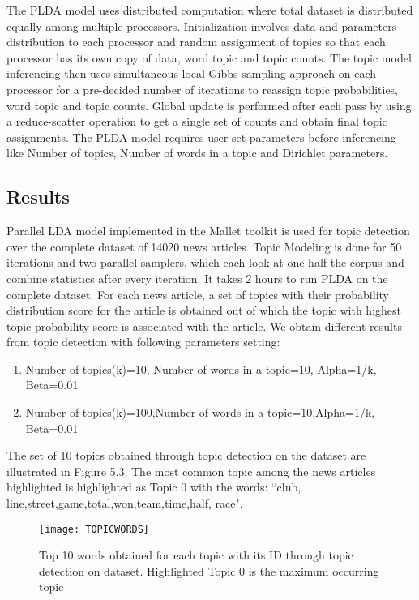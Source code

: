 The PLDA model uses distributed computation where total dataset is distributed equally among multiple processors. Initialization involves data and parameters distribution to each processor and random assignment of topics so that each processor has its own copy of data, word topic and topic counts. The topic model inferencing then uses simultaneous local Gibbs sampling approach on each processor for a pre-decided number of iterations to reassign topic probabilities, word topic and topic counts. Global update is performed after each pass by using a reduce-scatter operation to get a single set of counts and obtain final topic assignments.
The PLDA model requires user set parameters before inferencing like Number of topics, Number of words in a topic and Dirichlet parameters. 


\subsection{Results}

Parallel LDA model implemented in the Mallet\cite{McCallumMALLET} toolkit is used for topic detection over the complete dataset of 14020 news articles. 
Topic Modeling is done for 50 iterations and two parallel samplers, which each look at one half the corpus and combine
statistics after every iteration. It takes 2 hours to run PLDA on the complete dataset.
 For each news article, a set of topics with their probability distribution score for the article is obtained out of which the topic with highest topic probability score is associated with the article.  
We obtain different results from topic detection with following parameters setting:
\begin{enumerate}
 \item Number of topics(k)=10, Number of words in a topic=10, Alpha=1/k, Beta=0.01
 \item Number of topics(k)=100,Number of words in a topic=10,Alpha=1/k, Beta=0.01
\end{enumerate}
The set of 10 topics obtained through topic detection on the dataset are illustrated in Figure 5.3. The most common topic among the news articles highlighted is highlighted as Topic 0 with the words: ``club, line,street,game,total,won,team,time,half, race".

\begin{figure}[h]
\texttt{[image: TOPICWORDS]}
\caption{Top 10 words obtained for each topic with its ID through topic detection on dataset. Highlighted Topic 0 is the maximum occurring topic}
\end{figure} 


